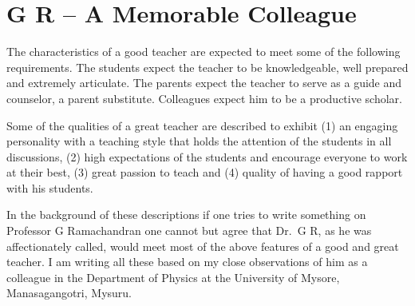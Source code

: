 \chapter[G R – A Memorable Colleague]{G R – A Memorable Colleague}\label{chap12}

\smallskip


The characteristics of a good teacher are expected to meet some of the following requirements. The students expect the teacher to be knowledgeable, well prepared and extremely articulate. The parents expect the teacher to serve as a guide and counselor, a parent substitute. Colleagues expect him to be a productive scholar.

Some of the qualities of a great teacher are described to exhibit (1) an engaging personality with a teaching style that holds the attention of the students in all discussions, (2) high expectations of the students and encourage everyone to work at their best, (3) great  passion to teach and  (4) quality of having a good rapport with his students.

In the background of these descriptions if one tries to write something on Professor G Ramachandran one cannot but agree that Dr.\ G R, as he was affectionately called, would meet most of the above features of a good and great teacher. I am writing all these based on my close observations of him as a colleague in the Department of Physics at the University of Mysore, Manasagangotri, Mysuru.


